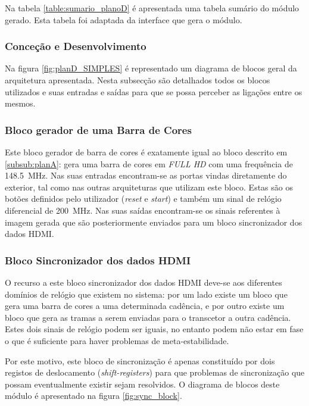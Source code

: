 Na tabela \ref {table:sumario_planoD} é apresentada uma tabela sumário do módulo gerado. Esta tabela foi adaptada da interface que gera o módulo.

\subsubsection{Conceção e Desenvolvimento}

Na figura \ref{fig:planD_SIMPLES} é representado um diagrama de blocos geral da arquitetura apresentada. Nesta subsecção são detalhados todos os blocos utilizados e suas entradas e saídas para que se possa perceber as ligações entre os mesmos. 

\subsubsection*{Bloco gerador de uma Barra de Cores} \label{subsub:serial_colorBarGenerator}

Este bloco gerador de barra de cores é exatamente igual ao bloco descrito em \ref{subsub:planA}: gera uma barra de cores em \textit{FULL HD} com uma frequência de \SI{148.5}{\mega\hertz}. Nas suas entradas encontram-se as portas vindas diretamente do exterior, tal como nas outras arquiteturas que utilizam este bloco. Estas são os botões definidos pelo utilizador (\textit{reset} e \textit{start}) e também um sinal de relógio diferencial de \SI{200}{\mega\hertz}. Nas suas saídas encontram-se os sinais referentes à imagem gerada que são posteriormente enviados para um bloco sincronizador dos dados HDMI.

\subsubsection*{Bloco Sincronizador dos dados HDMI} \label{subsub:serial_syncsignals}

O recurso a este bloco sincronizador dos dados HDMI deve-se aos diferentes domínios de relógio que existem no sistema: por um lado existe um bloco que gera uma barra de cores a uma determinada cadência, e por outro existe um bloco que gera as tramas a serem enviadas para o transcetor a outra cadência. Estes dois sinais de relógio podem ser iguais, no entanto podem não estar em fase o que é suficiente para haver problemas de meta-estabilidade. 

Por este motivo, este bloco de sincronização é apenas constituído por dois registos de deslocamento (\textit{shift-registers}) para que problemas de sincronização que possam eventualmente existir sejam resolvidos. O diagrama de blocos deste módulo é apresentado na figura \ref{fig:sync_block}. 


